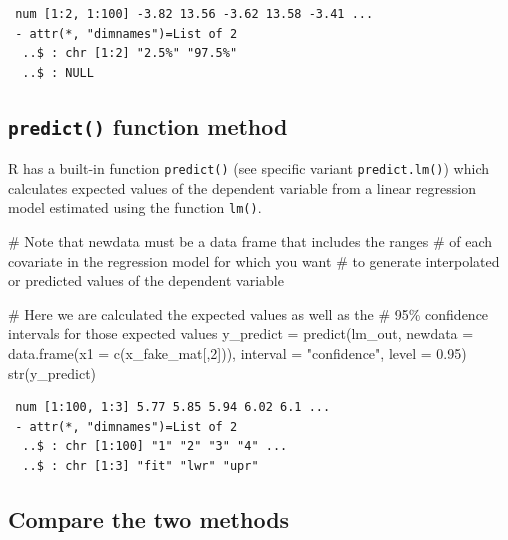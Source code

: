 \documentclass[
  letterpaper,
  DIV=11,
  numbers=noendperiod]{scrreprt}
\newenvironment{Shaded}{\begin{snugshade}}{\end{snugshade}}
\newcommand{\AttributeTok}[1]{\textcolor[rgb]{0.40,0.45,0.13}{#1}}
\newcommand{\CommentTok}[1]{\textcolor[rgb]{0.37,0.37,0.37}{#1}}
\newcommand{\DecValTok}[1]{\textcolor[rgb]{0.68,0.00,0.00}{#1}}
\newcommand{\FloatTok}[1]{\textcolor[rgb]{0.68,0.00,0.00}{#1}}
\newcommand{\FunctionTok}[1]{\textcolor[rgb]{0.28,0.35,0.67}{#1}}
\newcommand{\NormalTok}[1]{\textcolor[rgb]{0.00,0.23,0.31}{#1}}
\newcommand{\OtherTok}[1]{\textcolor[rgb]{0.00,0.23,0.31}{#1}}
\newcommand{\StringTok}[1]{\textcolor[rgb]{0.13,0.47,0.30}{#1}}
\begin{document}
\begin{verbatim}
 num [1:2, 1:100] -3.82 13.56 -3.62 13.58 -3.41 ...
 - attr(*, "dimnames")=List of 2
  ..$ : chr [1:2] "2.5%" "97.5%"
  ..$ : NULL
\end{verbatim}

\hypertarget{predict-function-method}{%
\subsection{\texorpdfstring{\texttt{predict()} function
method}{predict() function method}}\label{predict-function-method}}

R has a built-in function \texttt{predict()} (see specific variant
\texttt{predict.lm()}) which calculates expected values of the dependent
variable from a linear regression model estimated using the function
\texttt{lm()}.

\begin{Shaded}
\begin{Highlighting}[]
\CommentTok{\# Note that \textquotesingle{}newdata\textquotesingle{} must be a data frame that includes the ranges}
\CommentTok{\# of each covariate in the regression model for which you want }
\CommentTok{\# to generate interpolated or predicted values of the dependent variable}

\CommentTok{\# Here we are calculated the expected values as well as the }
\CommentTok{\# 95\% confidence intervals for those expected values}
\NormalTok{y\_predict }\OtherTok{=} \FunctionTok{predict}\NormalTok{(lm\_out,}
                 \AttributeTok{newdata =} \FunctionTok{data.frame}\NormalTok{(}\AttributeTok{x1 =} \FunctionTok{c}\NormalTok{(x\_fake\_mat[,}\DecValTok{2}\NormalTok{])),}
                 \AttributeTok{interval =} \StringTok{"confidence"}\NormalTok{, }\AttributeTok{level =} \FloatTok{0.95}\NormalTok{)}
\FunctionTok{str}\NormalTok{(y\_predict)}
\end{Highlighting}
\end{Shaded}

\begin{verbatim}
 num [1:100, 1:3] 5.77 5.85 5.94 6.02 6.1 ...
 - attr(*, "dimnames")=List of 2
  ..$ : chr [1:100] "1" "2" "3" "4" ...
  ..$ : chr [1:3] "fit" "lwr" "upr"
\end{verbatim}

\hypertarget{compare-the-two-methods}{%
\subsection{Compare the two methods}\label{compare-the-two-methods}}
\end{document}
